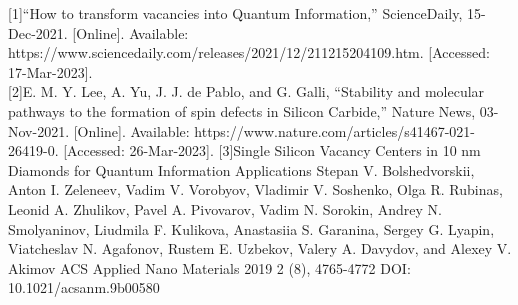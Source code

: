 \documentclass{article}
\begin{document}
[1]“How to transform vacancies into Quantum Information,” ScienceDaily, 15-Dec-2021. [Online]. Available: https://www.sciencedaily.com/releases/2021/12/211215204109.htm. [Accessed: 17-Mar-2023].  \\


[2]E. M. Y. Lee, A. Yu, J. J. de Pablo, and G. Galli, “Stability and molecular pathways to the formation of spin defects in Silicon Carbide,” Nature News, 03-Nov-2021. [Online]. Available: https://www.nature.com/articles/s41467-021-26419-0. [Accessed: 26-Mar-2023]. 
[3]Single Silicon Vacancy Centers in 10 nm Diamonds for Quantum Information Applications
Stepan V. Bolshedvorskii, Anton I. Zeleneev, Vadim V. Vorobyov, Vladimir V. Soshenko, Olga R. Rubinas, Leonid A. Zhulikov, Pavel A. Pivovarov, Vadim N. Sorokin, Andrey N. Smolyaninov, Liudmila F. Kulikova, Anastasiia S. Garanina, Sergey G. Lyapin, Viatcheslav N. Agafonov, Rustem E. Uzbekov, Valery A. Davydov, and Alexey V. Akimov
ACS Applied Nano Materials 2019 2 (8), 4765-4772
DOI: 10.1021/acsanm.9b00580
\end{document}
